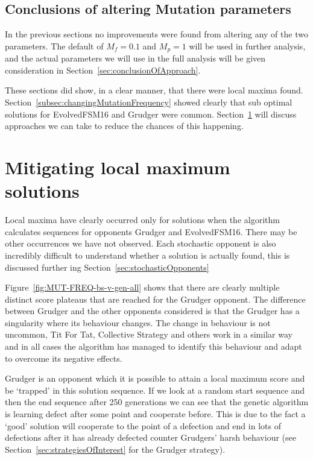 
\subsection{Conclusions of altering Mutation parameters}
In the previous sections no improvements were found from altering any of the two parameters. 
The default of $M_f=0.1$ and $M_p=1$ will be used in further analysis, and the actual parameters we will use in the full analysis will be given consideration in Section~\ref{sec:conclusionOfApproach}.

These sections did show, in a clear manner, that there were local maxima found. 
Section~\ref{subsec:changingMutationFrequency} showed clearly that sub optimal solutions for EvolvedFSM16 and Grudger were common.
Section~\ref{sec:mitigatingLocalMaximums} will discuss approaches we can take to reduce the chances of this happening.

\section{Mitigating local maximum solutions}\label{sec:mitigatingLocalMaximums}
Local maxima have clearly occurred only for solutions when the algorithm calculates sequences for opponents Grudger and EvolvedFSM16.
There may be other occurrences we have not observed.
Each stochastic opponent is also incredibly difficult to understand whether a solution is actually found, this is discussed further ing Section~\ref{sec:stochasticOpponents}


Figure~\ref{fig:MUT-FREQ-bs-v-gen-all} shows that there are clearly multiple distinct score plateaus that are reached for the Grudger opponent.
The difference between Grudger and the other opponents considered is that the Grudger has a singularity where its behaviour changes.
The change in behaviour is not uncommon, Tit For Tat, Collective Strategy and others work in a similar way and in all cases the algorithm has managed to identify this behaviour and adapt to overcome its negative effects.

Grudger is an opponent which it is possible to attain a local maximum score and be `trapped' in this solution sequence.
If we look at a random start sequence and then the end sequence after 250 generations we can see that the genetic algorithm is learning defect after some point and cooperate before.
This is due to the fact a `good' solution will cooperate to the point of a defection and end in lots of defections after it has already defected counter Grudgers' harsh behaviour (see Section~\ref{sec:strategiesOfInterest} for the Grudger strategy).


